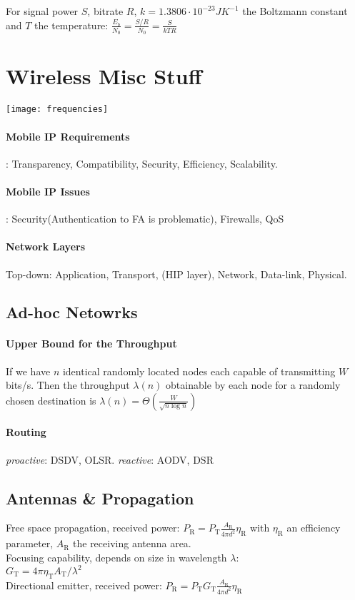 \documentclass[6pt]{scrartcl}
\begin{document}
\begin{multicols}{4}
For signal power $S$, bitrate $R$, $k = 1.3806\cdot10^{-23} JK^{-1}$ the Boltzmann constant and $T$ the temperature: $\frac{E_b}{N_0} = \frac{S/R}{N_0} = \frac{S}{kTR}$

\section{Wireless Misc Stuff}
\texttt{[image: frequencies]}

\paragraph{Mobile IP Requirements}:
Transparency, Compatibility, Security, Efficiency, Scalability.

\paragraph{Mobile IP Issues}: Security(Authentication to FA is problematic), Firewalls, QoS

\paragraph{Network Layers} Top-down: Application, Transport, (HIP layer), Network, Data-link, Physical.

\subsection{Ad-hoc Netowrks} %
\paragraph{Upper Bound for the Throughput} 
If we have $n$ identical randomly located nodes each capable of transmitting $W$ bits/s. 
Then the throughput $\lambda(n)$ obtainable by each node for a randomly chosen destination is $\lambda(n) = \Theta\left(\frac W{\sqrt{n\log n}}\right)$

\paragraph{Routing} \emph{proactive}: DSDV, OLSR. \emph{reactive}: AODV, DSR

\subsection{Antennas \& Propagation}
Free space propagation, received power: $P_\textrm{R} = P_\textrm{T}\frac{A_\textrm{R}}{4\pi d^2}\eta_\textrm{R}$ with $\eta_\textrm{R}$ an efficiency parameter, $A_\textrm{R}$ the receiving antenna area.
\\
Focusing capability, depends on size in wavelength $\lambda$:  
\\$G_\textrm{T} = 4\pi\eta_\textrm{T}A_\textrm{T}/\lambda^2$ \\
Directional emitter, received power: $P_\textrm{R} = P_\textrm{T}G_\textrm{T}\frac{A_\textrm{R}}{4\pi d^2}\eta_\textrm{R}$


\end{multicols}
\end{document}

